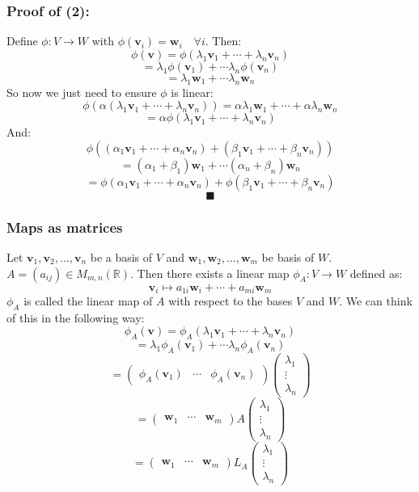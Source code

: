 \documentclass[12pt]{article}
\newcommand{\arbvec}[2]{\ensuremath{\textbf{#1}_1,\textbf{#1}_2,\dots,\textbf{#1}_{#2}}}
\newcommand{\genvec}[3]{#1_1\textbf{#2}_1+\cdots + #1_#3\textbf{#2}_#3}
\begin{document}
\subsubsection*{Proof of (2):}
Define \(\phi:V\to W\) with \(\phi(\textbf{v}_i)=\textbf{w}_i\quad \forall i\). Then:
\[\phi(\textbf{v})=\phi(\genvec{\lambda}{v}{n})\]
\[=\lambda_1\phi(\textbf{v}_1)+\cdots\lambda_n\phi(\textbf{v}_n)\]
\[=\lambda_1\textbf{w}_1 + \cdots \lambda_n\textbf{w}_n\]
So now we just need to ensure \(\phi\) is linear:
\[\phi(\alpha(\genvec{\lambda}{v}{n}))=\genvec{\alpha\lambda}{w}{n}\]
\[=\alpha\phi(\genvec{\lambda}{v}{n})\]
And:
\[\phi((\genvec{\alpha}{v}{n})+(\genvec{\beta}{v}{n}))\]
\[=(\alpha_1+\beta_1)\textbf{w}_1+\cdots (\alpha_n+\beta_n)\textbf{w}_n\]
\[=\phi(\genvec{\alpha}{v}{n})+\phi(\genvec{\beta}{v}{n})\]
\[\blacksquare\]
\subsubsection*{Maps as matrices}
Let \(\arbvec{v}{n}\) be a basis of \(V\) and \(\arbvec{w}{m}\) be basis of \(W\). \(A=(a_{ij})\in M_{m,n}(\mathbb{R})\). Then there exists a linear map \(\phi_A:V\to W\) defined as:
\[\textbf{v}_i\mapsto a_{1i}\textbf{w}_i+\cdots + a_{mi}\textbf{w}_m\]
\(\phi_A\) is called the linear map of \(A\) with respect to the bases \(V\) and \(W\). We can think of this in the following way:
\[\phi_A(\textbf{v})=\phi_A(\genvec{\lambda}{v}{n})\]
\[=\lambda_1\phi_A(\textbf{v}_1)+\cdots \lambda_n\phi_A(\textbf{v}_n)\]
\[=\begin{pmatrix}
    \phi_A(\textbf{v}_1) & \cdots & \phi_A(\textbf{v}_n)
\end{pmatrix}\begin{pmatrix} \lambda_1 \\
\vdots \\
\lambda_n
\end{pmatrix}\]
\[=\begin{pmatrix}
    \textbf{w}_1 & \cdots & \textbf{w}_m
\end{pmatrix}A\begin{pmatrix}
    \lambda_1 \\
    \vdots \\
    \lambda_n
\end{pmatrix}\]
\[=\begin{pmatrix}
    \textbf{w}_1 & \cdots & \textbf{w}_m
\end{pmatrix}L_A\begin{pmatrix}
    \lambda_1 \\
    \vdots \\
    \lambda_n
\end{pmatrix}\]
\end{document}
